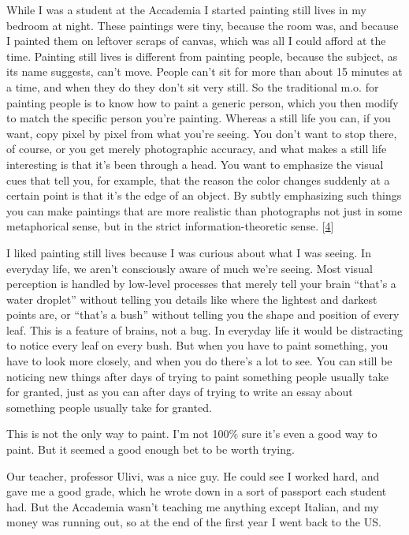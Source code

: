 While I was a student at the Accademia I started painting still lives in
my bedroom at night. These paintings were tiny, because the room was,
and because I painted them on leftover scraps of canvas, which was all I
could afford at the time. Painting still lives is different from
painting people, because the subject, as its name suggests, can't move.
People can't sit for more than about 15 minutes at a time, and when they
do they don't sit very still. So the traditional m.o. for painting
people is to know how to paint a generic person, which you then modify
to match the specific person you're painting. Whereas a still life you
can, if you want, copy pixel by pixel from what you're seeing. You don't
want to stop there, of course, or you get merely photographic accuracy,
and what makes a still life interesting is that it's been through a
head. You want to emphasize the visual cues that tell you, for example,
that the reason the color changes suddenly at a certain point is that
it's the edge of an object. By subtly emphasizing such things you can
make paintings that are more realistic than photographs not just in some
metaphorical sense, but in the strict information-theoretic sense.
{[}\hyperref[f4n]{4}{]}

I liked painting still lives because I was curious about what I was
seeing. In everyday life, we aren't consciously aware of much we're
seeing. Most visual perception is handled by low-level processes that
merely tell your brain ``that's a water droplet'' without telling you
details like where the lightest and darkest points are, or ``that's a
bush'' without telling you the shape and position of every leaf. This is
a feature of brains, not a bug. In everyday life it would be distracting
to notice every leaf on every bush. But when you have to paint
something, you have to look more closely, and when you do there's a lot
to see. You can still be noticing new things after days of trying to
paint something people usually take for granted, just as you can after
days of trying to write an essay about something people usually take for
granted.

This is not the only way to paint. I'm not 100\% sure it's even a good
way to paint. But it seemed a good enough bet to be worth trying.

Our teacher, professor Ulivi, was a nice guy. He could see I worked
hard, and gave me a good grade, which he wrote down in a sort of
passport each student had. But the Accademia wasn't teaching me anything
except Italian, and my money was running out, so at the end of the first
year I went back to the US.

